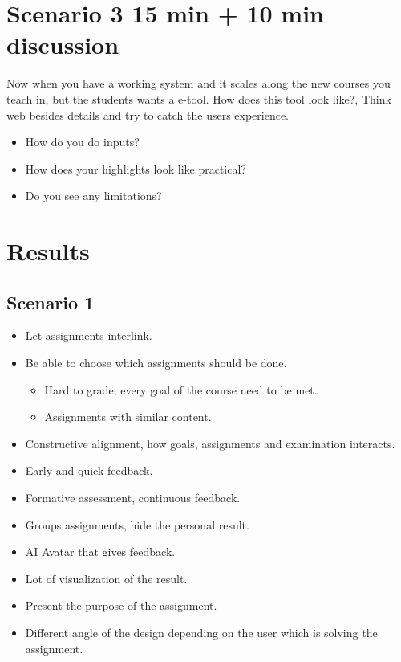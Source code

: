\section*{Scenario 3 15 min + 10 min discussion}
Now when you have a working system and it scales along the new courses you teach in, but the students wants a e-tool. How does this tool look like?, Think web besides details and try to catch the users experience.

\begin{itemize}
\item How do you do inputs?
\item How does your highlights look like practical?
\item Do you see any limitations?
\end{itemize} 


\section*{Results}
\subsection*{Scenario 1}
\begin{itemize}
\item Let assignments interlink.
\item Be able to choose which assignments should be done.
    \begin{itemize}
    \item Hard to grade, every goal of the course need to be met.
    \item Assignments with similar content.
    \end{itemize}
\item Constructive alignment, how goals, assignments and examination interacts.
\item Early and quick feedback.
\item Formative assessment, continuous feedback.
\item Groups assignments, hide the personal result.
\item AI Avatar that gives feedback.
\item Lot of visualization of the result.
\item Present the purpose of the assignment.
\item Different angle of the design depending on the user which is solving the assignment.
\end{itemize}


